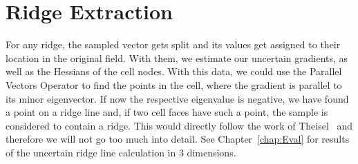 \section{Ridge Extraction}\label{sec:ridgeextract}

For any ridge, the sampled vector gets split and its values get assigned
to their location in the original field. With them, we estimate our
uncertain gradients, as well as the Hessians of the cell nodes. With
this data, we could use the Parallel Vectors Operator to find the points
in the cell, where the gradient is parallel to its minor eigenvector. If
now the respective eigenvalue is negative, we have found a point on a
ridge line and, if two cell faces have such a point, the sample is
considered to contain a ridge. This would directly follow the work of
Theisel \etal\ and therefore we will not go too much into detail. See
Chapter~\ref{chap:Eval} for results of the uncertain ridge line
calculation in 3 dimensions.\\
